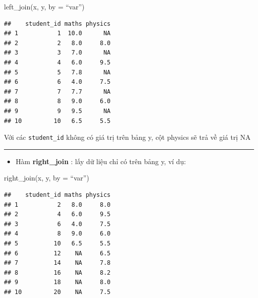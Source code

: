 \documentclass[]{krantz}
\makeatletter
\newenvironment{Shaded}{\begin{snugshade}}{\end{snugshade}}
\newcommand{\DataTypeTok}[1]{\textcolor[rgb]{0.27,0.27,0.27}{#1}}
\newcommand{\KeywordTok}[1]{\textcolor[rgb]{0.27,0.27,0.27}{\textbf{#1}}}
\newcommand{\NormalTok}[1]{#1}
\newcommand{\OperatorTok}[1]{\textcolor[rgb]{0.43,0.43,0.43}{\textbf{#1}}}
\newcommand{\StringTok}[1]{\textcolor[rgb]{0.5,0.5,0.5}{#1}}
\providecommand{\tightlist}{%
  \setlength{\itemsep}{0pt}\setlength{\parskip}{0pt}}
\renewenvironment{quote}{\begin{VF}}{\end{VF}}
\newenvironment{kframe}{%
\medskip{}
\setlength{\fboxsep}{.8em}
 \def\at@end@of@kframe{}%
 \ifinner\ifhmode%
  \def\at@end@of@kframe{\end{minipage}}%
  \begin{minipage}{\columnwidth}%
 \fi\fi%
 \def\FrameCommand##1{\hskip\@totalleftmargin \hskip-\fboxsep
 \colorbox{shadecolor}{##1}\hskip-\fboxsep
     \hskip-\linewidth \hskip-\@totalleftmargin \hskip\columnwidth}%
 \MakeFramed {\advance\hsize-\width
   \@totalleftmargin\z@ \linewidth\hsize
   \@setminipage}}%
 {\par\unskip\endMakeFramed%
 \at@end@of@kframe}
\renewenvironment{Shaded}{\begin{kframe}}{\end{kframe}}
\renewenvironment{Shaded}{\begin{snugshade}}{\end{snugshade}}
\renewcommand{\DataTypeTok}[1]{\textcolor[rgb]{0.13,0.29,0.53}{#1}}
\renewcommand{\KeywordTok}[1]{\textcolor[rgb]{0.13,0.29,0.53}{\textbf{#1}}}
\renewcommand{\NormalTok}[1]{#1}
\renewcommand{\OperatorTok}[1]{\textcolor[rgb]{0.81,0.36,0.00}{\textbf{#1}}}
\renewcommand{\StringTok}[1]{\textcolor[rgb]{0.31,0.60,0.02}{#1}}
\theoremstyle{definition}
\theoremstyle{definition}
\theoremstyle{definition}
\theoremstyle{remark}
\makeatother
\begin{document}
\begin{quote}
left\_join(x, y, by = ``var'')
\end{quote}

\begin{Shaded}
\end{Shaded}

\begin{verbatim}
##    student_id maths physics
## 1           1  10.0      NA
## 2           2   8.0     8.0
## 3           3   7.0      NA
## 4           4   6.0     9.5
## 5           5   7.8      NA
## 6           6   4.0     7.5
## 7           7   7.7      NA
## 8           8   9.0     6.0
## 9           9   9.5      NA
## 10         10   6.5     5.5
\end{verbatim}

Với các \texttt{student\_id} không có giá trị trên bảng y, cột physics
sẽ trả về giá trị NA

\begin{center}\rule{0.5\linewidth}{\linethickness}\end{center}

\begin{itemize}
\tightlist
\item
  Hàm \textbf{right\_join} : lấy dữ liệu chỉ có trên bảng y, ví dụ:
\end{itemize}

\begin{quote}
right\_join(x, y, by = ``var'')
\end{quote}

\begin{Shaded}
\end{Shaded}

\begin{verbatim}
##    student_id maths physics
## 1           2   8.0     8.0
## 2           4   6.0     9.5
## 3           6   4.0     7.5
## 4           8   9.0     6.0
## 5          10   6.5     5.5
## 6          12    NA     6.5
## 7          14    NA     7.8
## 8          16    NA     8.2
## 9          18    NA     8.0
## 10         20    NA     7.5
\end{verbatim}
\end{document}
